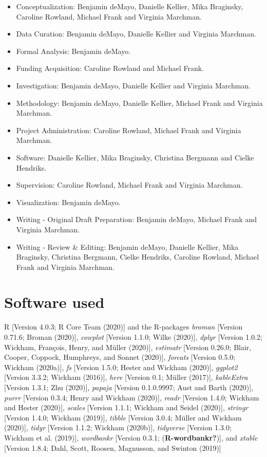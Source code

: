 \documentclass[
  english,
  ,man,floatsintext]{apa6}
\providecommand{\tightlist}{%
  \setlength{\itemsep}{0pt}\setlength{\parskip}{0pt}}
\begin{document}
\begin{itemize}
\tightlist
\item
  Conceptualization: Benjamin deMayo, Danielle Kellier, Mika Braginsky, Caroline Rowland, Michael Frank and Virginia Marchman.
\item
  Data Curation: Benjamin deMayo, Danielle Kellier and Virginia Marchman.
\item
  Formal Analysis: Benjamin deMayo.
\item
  Funding Acquisition: Caroline Rowland and Michael Frank.
\item
  Investigation: Benjamin deMayo, Danielle Kellier and Virginia Marchman.
\item
  Methodology: Benjamin deMayo, Danielle Kellier, Michael Frank and Virginia Marchman.
\item
  Project Administration: Caroline Rowland, Michael Frank and Virginia Marchman.
\item
  Software: Danielle Kellier, Mika Braginsky, Christina Bergmann and Cielke Hendriks.
\item
  Supervision: Caroline Rowland, Michael Frank and Virginia Marchman.
\item
  Visualization: Benjamin deMayo.
\item
  Writing - Original Draft Preparation: Benjamin deMayo, Michael Frank and Virginia Marchman.
\item
  Writing - Review \& Editing: Benjamin deMayo, Danielle Kellier, Mika Braginsky, Christina Bergmann, Cielke Hendriks, Caroline Rowland, Michael Frank and Virginia Marchman.
\end{itemize}

\hypertarget{software-used}{%
\section{Software used}\label{software-used}}

R {[}Version 4.0.3; R Core Team (2020){]} and the R-packages \emph{broman} {[}Version 0.71.6; Broman (2020){]}, \emph{cowplot} {[}Version 1.1.0; Wilke (2020){]}, \emph{dplyr} {[}Version 1.0.2; Wickham, François, Henry, and Müller (2020){]}, \emph{estimatr} {[}Version 0.26.0; Blair, Cooper, Coppock, Humphreys, and Sonnet (2020){]}, \emph{forcats} {[}Version 0.5.0; Wickham (2020a){]}, \emph{fs} {[}Version 1.5.0; Hester and Wickham (2020){]}, \emph{ggplot2} {[}Version 3.3.2; Wickham (2016){]}, \emph{here} {[}Version 0.1; Müller (2017){]}, \emph{kableExtra} {[}Version 1.3.1; Zhu (2020){]}, \emph{papaja} {[}Version 0.1.0.9997; Aust and Barth (2020){]}, \emph{purrr} {[}Version 0.3.4; Henry and Wickham (2020){]}, \emph{readr} {[}Version 1.4.0; Wickham and Hester (2020){]}, \emph{scales} {[}Version 1.1.1; Wickham and Seidel (2020){]}, \emph{stringr} {[}Version 1.4.0; Wickham (2019){]}, \emph{tibble} {[}Version 3.0.4; Müller and Wickham (2020){]}, \emph{tidyr} {[}Version 1.1.2; Wickham (2020b){]}, \emph{tidyverse} {[}Version 1.3.0; Wickham et al. (2019){]}, \emph{wordbankr} {[}Version 0.3.1; (\textbf{R-wordbankr?}){]}, and \emph{xtable} {[}Version 1.8.4; Dahl, Scott, Roosen, Magnusson, and Swinton (2019){]}
\end{document}
